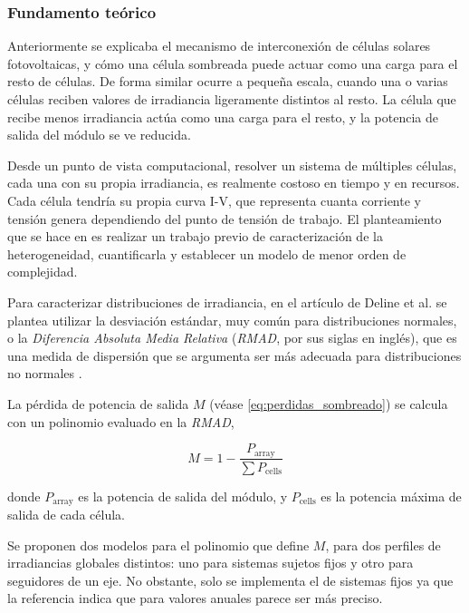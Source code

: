 \subsubsection{Fundamento teórico}

Anteriormente se explicaba el mecanismo de interconexión de células solares fotovoltaicas, y cómo una célula sombreada puede actuar como una carga para el resto de células. De forma similar ocurre a pequeña escala, cuando una o varias células reciben valores de irradiancia ligeramente distintos al resto. La célula que recibe menos irradiancia actúa como una carga para el resto, y la potencia de salida del módulo se ve reducida.

Desde un punto de vista computacional, resolver un sistema de múltiples células, cada una con su propia irradiancia, es realmente costoso en tiempo y en recursos. Cada célula tendría su propia curva I-V, que representa cuanta corriente y tensión genera dependiendo del punto de tensión de trabajo. El planteamiento que se hace en \cite{Deline_Ayala_Pelaez_MacAlpine_Olalla_2020} es realizar un trabajo previo de caracterización de la heterogeneidad, cuantificarla y establecer un modelo de menor orden de complejidad.

Para caracterizar distribuciones de irradiancia, en el artículo de Deline et al. se plantea utilizar la desviación estándar, muy común para distribuciones normales, o la \textit{Diferencia Absoluta Media Relativa} (\textit{RMAD}, por sus siglas en inglés), que es una medida de dispersión que se argumenta ser más adecuada para distribuciones no normales \cite{Ginis_mean_difference_2003}.

La pérdida de potencia de salida $M$ (véase \ref{eq:perdidas_sombreado}) se calcula con un polinomio evaluado en la \textit{RMAD}, 

\begin{equation} \label{eq:perdidas_heterogeneidad}
    M = 1 - \frac{P_\text{array}}{\sum P_\text{cells}}
\end{equation}

donde $P_\text{array}$ es la potencia de salida del módulo, y $P_\text{cells}$ es la potencia máxima de salida de cada célula.

Se proponen dos modelos para el polinomio que define $M$, para dos perfiles de irradiancias globales distintos: uno para sistemas sujetos fijos y otro para seguidores de un eje. No obstante, solo se implementa el de sistemas fijos ya que la referencia indica que para valores anuales parece ser más preciso.

